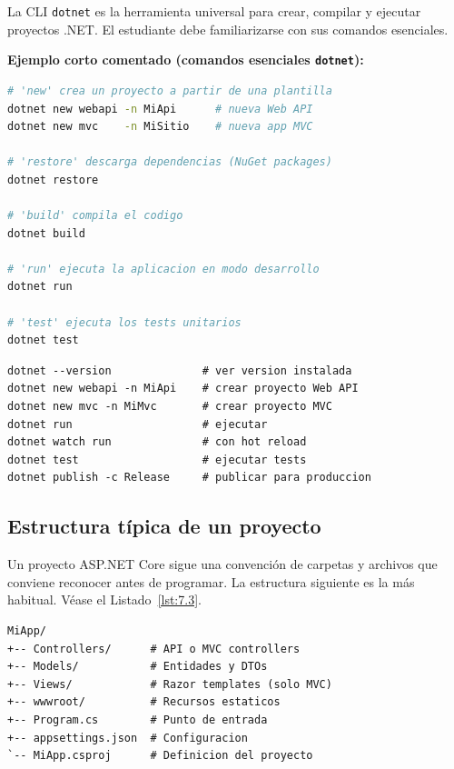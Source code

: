 \documentclass[11pt,a4paper,openany]{book}
\begin{document}
La CLI \texttt{dotnet} es la herramienta universal para
crear, compilar y ejecutar proyectos .NET. El estudiante debe
familiarizarse con sus comandos esenciales.

\textbf{Ejemplo corto comentado (comandos esenciales \texttt{dotnet}):}
\begin{lstlisting}[language=bash,numbers=none,caption={Ejemplo de Shell},label=lst:7.1]
# 'new' crea un proyecto a partir de una plantilla
dotnet new webapi -n MiApi      # nueva Web API
dotnet new mvc    -n MiSitio    # nueva app MVC

# 'restore' descarga dependencias (NuGet packages)
dotnet restore

# 'build' compila el codigo
dotnet build

# 'run' ejecuta la aplicacion en modo desarrollo
dotnet run

# 'test' ejecuta los tests unitarios
dotnet test
\end{lstlisting}


\begin{lstlisting}[style=shell,numbers=none,caption={Ejemplo de Shell},label=lst:7.2]
dotnet --version              # ver version instalada
dotnet new webapi -n MiApi    # crear proyecto Web API
dotnet new mvc -n MiMvc       # crear proyecto MVC
dotnet run                    # ejecutar
dotnet watch run              # con hot reload
dotnet test                   # ejecutar tests
dotnet publish -c Release     # publicar para produccion
\end{lstlisting}

\subsection{Estructura típica de un proyecto}

Un proyecto ASP.NET Core sigue una convención de carpetas y
archivos que conviene reconocer antes de programar. La estructura
siguiente es la más habitual. V\'ease el Listado~\ref{lst:7.3}.


\begin{lstlisting}[style=shell,numbers=none,caption={Ejemplo de Shell},label=lst:7.3]
MiApp/
+-- Controllers/      # API o MVC controllers
+-- Models/           # Entidades y DTOs
+-- Views/            # Razor templates (solo MVC)
+-- wwwroot/          # Recursos estaticos
+-- Program.cs        # Punto de entrada
+-- appsettings.json  # Configuracion
`-- MiApp.csproj      # Definicion del proyecto
\end{lstlisting}
\end{document}
